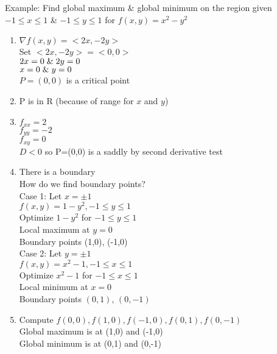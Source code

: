 \documentclass[12pt,letterpaper, onecolumn]{exam}
\begin{document}
		Example: Find global maximum \& global minimum on the region given $-1 \leq x \leq 1$ \& $-1\leq y \leq 1$ for $f(x,y)=x^2-y^2$
		\begin{enumerate}
			\item $\nabla f(x,y)=<2x,-2y>$\\
			Set $<2x,-2y>=<0,0>$\\
			$2x=0 \hspace*{0.10cm}\&\hspace*{0.10cm} 2y=0$\\
			$x=0 \hspace*{0.10cm}\&\hspace*{0.10cm}y=0$\\
			$P=(0,0)$ is a critical point
			\item P is in R (because of range for $x$ and $y$)
			\item $f_{xx}=2$\\
			$f_{yy}=-2$\\
			$f_{xy}=0$\\
			$D<0$ so P=(0,0) is a saddly by second derivative test\\
			\item There is a boundary\\
			How do we find boundary points?\\
			Case 1: Let $x=\pm 1$\\
			$f(x,y)=1-y^2, -1\leq y \leq 1$\\
			Optimize $1-y^2$ for $-1 \leq y \leq 1$\\
			Local maximum at $y=0$\\
			Boundary points (1,0), (-1,0)\\
			Case 2: Let $y=\pm 1$\\
			$f(x,y)=x^2-1, -1\leq x \leq 1$\\
			Optimize $x^2-1$ for $-1\leq x \leq 1$\\
			Local minimum at $x=0$\\
			Boundary points $(0,1)$, $(0,-1)$
			\item Compute $f(0,0), f(1,0), f(-1,0), f(0,1), f(0,-1)$\\
			Global maximum is at (1,0) and (-1,0)\\
			Global minimum is at (0,1) and (0,-1)\\

		\end{enumerate}
\end{document}
